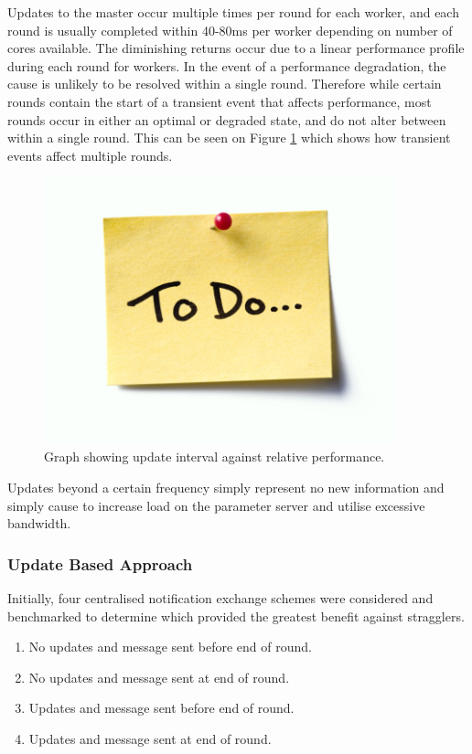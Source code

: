\documentclass[12pt]{article}
\begin{document}
Updates to the master occur multiple times per round for each worker, and each round is usually completed within 40-80ms per worker depending on number of cores available. The diminishing returns occur due to a linear performance profile during each round for workers. In the event of a performance degradation, the cause is unlikely to be resolved within a single round. Therefore while certain rounds contain the start of a transient event that affects performance, most rounds occur in either an optimal or degraded state, and do not alter between within a single round. This can be seen on Figure \ref{RoundDegradation} which shows how transient events affect multiple rounds.

\begin{figure}[H]
  \centering
  \includegraphics[width=4in]{todo}
  \caption[]{Graph showing update interval against relative performance.}
  \label{RoundDegradation}
\end{figure}

Updates beyond a certain frequency simply represent no new information and simply cause to increase load on the parameter server and utilise excessive bandwidth.
\newline
\subsubsection{Update Based Approach}
Initially, four centralised notification exchange schemes were considered and benchmarked to determine which provided the greatest benefit against stragglers.

\begin{enumerate}
\item No updates and message sent before end of round.
\item No updates and message sent at end of round.
\item Updates and message sent before end of round.
\item Updates and message sent at end of round.
\end{enumerate}
\end{document}
